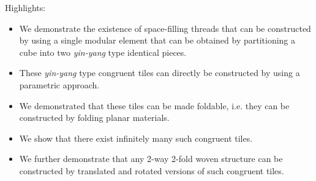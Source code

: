 \documentclass[10pt]{article}
\begin{document}
Highlights:
\begin{itemize}
\item We demonstrate the existence of space-filling threads that can be constructed by using a single modular element that can be obtained by partitioning a cube into two \textit{yin-yang} type identical pieces. 
\item These \textit{yin-yang} type congruent tiles can directly be constructed by using a parametric approach. 
\item We demonstrated that these tiles can be made foldable, i.e. they can be constructed by folding planar materials.
\item We show that there exist infinitely many such congruent tiles. 
\item We further demonstrate that any 2-way 2-fold woven structure can be constructed by translated and rotated versions of such congruent tiles.
\end{itemize}
\end{document}
